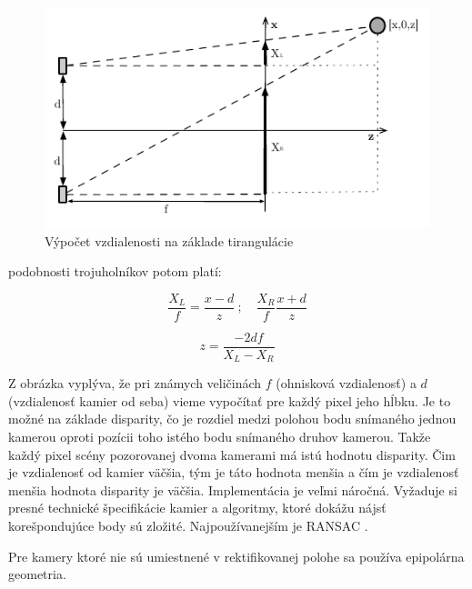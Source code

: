 \begin{figure}[H]
\begin{center}
	\includegraphics[scale=1.4]{images/stereoscope}
	\caption{Výpočet vzdialenosti na základe tirangulácie}
	\end{center}
\end{figure}

podobnosti trojuholníkov potom platí:


\begin{figure}[H]
    \centering
    \begin{minipage}[b]{0.49\textwidth}
        $$\frac{X_L}{f}=\frac{x-d}{z}\ {;}\quad \frac{X_R}{f}\frac{x+d}{z}$$ 
    \end{minipage}
    \hfill
    \begin{minipage}[b]{0.49\textwidth}
       $$ z=\frac{-2df}{X_L-X_R}$$
    \end{minipage}
\end{figure}



Z obrázka vyplýva, že pri známych veličinách $f$ (ohnisková vzdialenosť) a $d$ (vzdialenosť kamier od seba) vieme vypočítať pre každý pixel jeho hĺbku. Je to možné na základe disparity, čo je rozdiel medzi polohou bodu snímaného jednou kamerou oproti pozícii toho istého bodu snímaného druhov kamerou. Takže každý pixel scény pozorovanej dvoma kamerami má istú hodnotu disparity. Čim je vzdialenosť od kamier väčšia, tým je táto hodnota menšia a čím je vzdialenosť menšia hodnota disparity je väčšia. Implementácia je veľmi náročná. Vyžaduje si presné technické špecifikácie kamier a algoritmy, ktoré dokážu nájsť korešpondujúce body sú zložité. Najpoužívanejším je RANSAC \cite{pocitacove_videnie_v_praxi}. 

Pre kamery ktoré nie sú umiestnené v rektifikovanej  polohe sa používa epipolárna geometria. 


